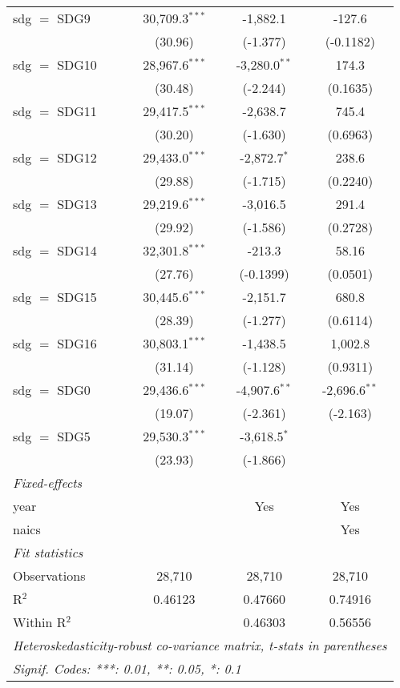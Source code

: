 \begin{tabular}{lccc}
   sdg $=$ SDG9  & 30,709.3$^{***}$ & -1,882.1         & -127.6\\   
                 & (30.96)          & (-1.377)         & (-0.1182)\\   
   sdg $=$ SDG10 & 28,967.6$^{***}$ & -3,280.0$^{**}$  & 174.3\\   
                 & (30.48)          & (-2.244)         & (0.1635)\\   
   sdg $=$ SDG11 & 29,417.5$^{***}$ & -2,638.7         & 745.4\\   
                 & (30.20)          & (-1.630)         & (0.6963)\\   
   sdg $=$ SDG12 & 29,433.0$^{***}$ & -2,872.7$^{*}$   & 238.6\\   
                 & (29.88)          & (-1.715)         & (0.2240)\\   
   sdg $=$ SDG13 & 29,219.6$^{***}$ & -3,016.5         & 291.4\\   
                 & (29.92)          & (-1.586)         & (0.2728)\\   
   sdg $=$ SDG14 & 32,301.8$^{***}$ & -213.3           & 58.16\\   
                 & (27.76)          & (-0.1399)        & (0.0501)\\   
   sdg $=$ SDG15 & 30,445.6$^{***}$ & -2,151.7         & 680.8\\   
                 & (28.39)          & (-1.277)         & (0.6114)\\   
   sdg $=$ SDG16 & 30,803.1$^{***}$ & -1,438.5         & 1,002.8\\   
                 & (31.14)          & (-1.128)         & (0.9311)\\   
   sdg $=$ SDG0  & 29,436.6$^{***}$ & -4,907.6$^{**}$  & -2,696.6$^{**}$\\   
                 & (19.07)          & (-2.361)         & (-2.163)\\   
   sdg $=$ SDG5  & 29,530.3$^{***}$ & -3,618.5$^{*}$   &   \\   
                 & (23.93)          & (-1.866)         &   \\   
   \midrule
   \emph{Fixed-effects}\\
   year          &                  & Yes              & Yes\\  
   naics         &                  &                  & Yes\\  
   \midrule
   \emph{Fit statistics}\\
   Observations  & 28,710           & 28,710           & 28,710\\  
   R$^2$         & 0.46123          & 0.47660          & 0.74916\\  
   Within R$^2$  &                  & 0.46303          & 0.56556\\  
   \midrule \midrule
   \multicolumn{4}{l}{\emph{Heteroskedasticity-robust co-variance matrix, t-stats in parentheses}}\\
   \multicolumn{4}{l}{\emph{Signif. Codes: ***: 0.01, **: 0.05, *: 0.1}}\\
\end{tabular}
\par\endgroup


